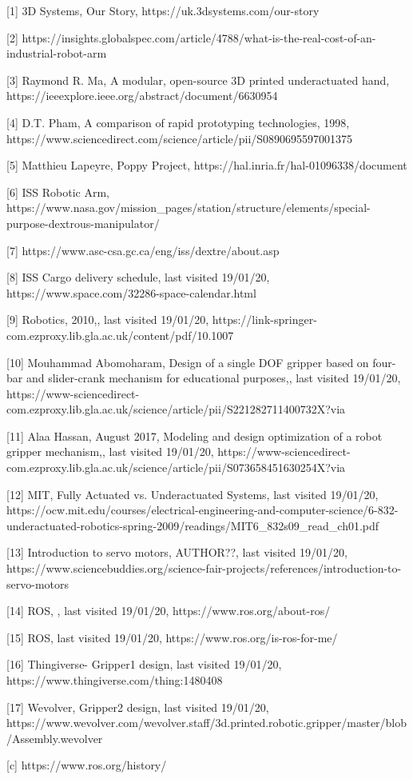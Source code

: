 \documentclass{l4proj}
\begin{document}

[1] 3D Systems, Our Story, https://uk.3dsystems.com/our-story

[2] https://insights.globalspec.com/article/4788/what-is-the-real-cost-of-an-industrial-robot-arm

[3] Raymond R. Ma, A modular, open-source 3D printed underactuated hand, https://ieeexplore.ieee.org/abstract/document/6630954

[4] D.T. Pham, A comparison of rapid prototyping technologies, 1998, https://www.sciencedirect.com/science/article/pii/S0890695597001375

[5] Matthieu Lapeyre, Poppy Project, https://hal.inria.fr/hal-01096338/document

[6] ISS Robotic Arm, https://www.nasa.gov/mission_pages/station/structure/elements/special-purpose-dextrous-manipulator/

[7] https://www.asc-csa.gc.ca/eng/iss/dextre/about.asp

[8] ISS Cargo delivery schedule, last visited 19/01/20, https://www.space.com/32286-space-calendar.html

[9] Robotics, 2010,, last visited 19/01/20, https://link-springer-com.ezproxy.lib.gla.ac.uk/content/pdf/10.1007%

[10] Mouhammad Abomoharam, Design of a single DOF gripper based on four-bar and slider-crank mechanism for educational purposes,, last visited 19/01/20, https://www-sciencedirect-com.ezproxy.lib.gla.ac.uk/science/article/pii/S221282711400732X?via%

[11] Alaa Hassan, August 2017, Modeling and design optimization of a robot gripper mechanism,, last visited 19/01/20, https://www-sciencedirect-com.ezproxy.lib.gla.ac.uk/science/article/pii/S073658451630254X?via%

[12] MIT, Fully Actuated vs. Underactuated Systems, last visited 19/01/20, https://ocw.mit.edu/courses/electrical-engineering-and-computer-science/6-832-underactuated-robotics-spring-2009/readings/MIT6_832s09_read_ch01.pdf

[13] Introduction to servo motors, AUTHOR??, last visited 19/01/20, https://www.sciencebuddies.org/science-fair-projects/references/introduction-to-servo-motors

[14] ROS, , last visited 19/01/20, https://www.ros.org/about-ros/

[15] ROS, last visited 19/01/20, https://www.ros.org/is-ros-for-me/

[16] Thingiverse- Gripper1 design, last visited 19/01/20, https://www.thingiverse.com/thing:1480408

[17] Wevolver, Gripper2 design, last visited 19/01/20, https://www.wevolver.com/wevolver.staff/3d.printed.robotic.gripper/master/blob/Assembly.wevolver

[c] https://www.ros.org/history/
\end{document}

